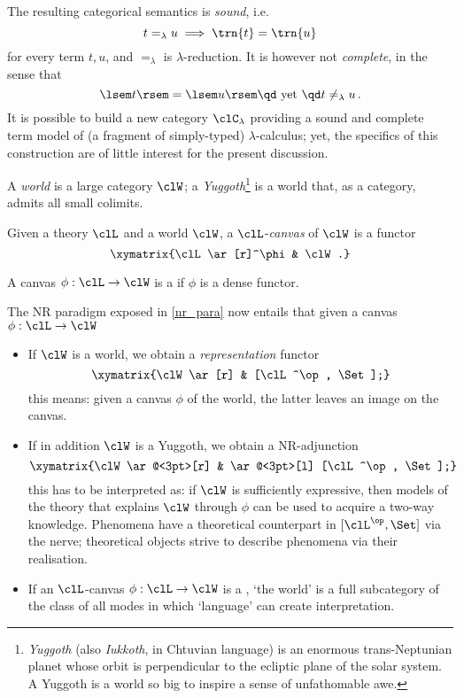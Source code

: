 The resulting categorical semantics is \emph{sound}, i.e.
\[ t=_\lambda u \implies \trn{t}=\trn{u} \]
for every term $t,u$, and $=_\lambda$ is $\lambda$-reduction. It is however not \emph{complete}, in the sense that
\[ \lsem t \rsem = \lsem u \rsem \text{\qd yet \qd} t\neq_\lambda u\,. \]
It is possible to build a new category $\clC_\lambda$ providing a sound and complete term model of (a fragment of simply-typed) $\lambda$-calculus; yet, the specifics of this construction are of little interest for the present discussion.
\begin{definition}\label{mondo_yalda}
	A \emph{world} is a large category $\clW$; a \emph{Yuggoth}\footnote{\emph{Yuggoth} (also \emph{Iukkoth}, {\yugg} in Chtuvian language) is an enormous trans-Neptunian planet whose orbit is perpendicular to the ecliptic plane of the solar system. A Yuggoth is a world so big to inspire a sense of unfathomable awe.} is a world that, as a category, admits all small colimits.
\end{definition}
\begin{definition}\label{canvas_scienza}
	Given a theory $\clL$ and a world $\clW$, a $\clL$-\emph{canvas} of $\clW$ is a functor
	\[\xymatrix{\clL \ar[r]^\phi & \clW.}\]
	
	A canvas $\phi : \clL \to \clW$ is a \emph{\science} if $\phi$ is a dense functor.
\end{definition}
	\begin{remark}\label{remark_yuggoth_1}
	The NR paradigm exposed in \autoref{nr_para} now entails that given a canvas $\phi : \clL \to \clW$
	\begin{itemize}
		\item If $\clW$ is a world, we obtain a \emph{representation} functor
		      \[ \xymatrix{\clW \ar[r] & [\clL^\op, \Set];} \]
		      this means: given a canvas $\phi$ of the world, the latter leaves an image on the canvas.
		\item If in addition $\clW$ is a Yuggoth, we obtain a NR-adjunction
		      \[\xymatrix{\clW \ar@<3pt>[r] & \ar@<3pt>[l] [\clL^\op, \Set];}\]
		      this has to be interpreted as: if $\clW$ is sufficiently expressive, then models of the theory that explains $\clW$ through $\phi$ can be used to acquire a two-way knowledge. Phenomena have a theoretical counterpart in $[\clL^\op,\Set]$ via the nerve; theoretical objects strive to describe phenomena via their realisation.
		\item If an $\clL$-canvas $\phi : \clL \to \clW$ is a \science, `the world' is a full subcategory of the class of all modes in which `language' can create interpretation.
	\end{itemize}
\end{remark}
